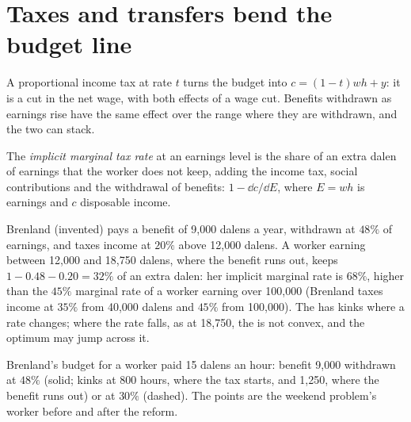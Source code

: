 \section{Taxes and transfers bend the budget line}\label{sec:b1:labour-supply-and-saving:taxes}

A proportional income tax at rate $t$ turns the budget into
$c = (1 - t)w h + y$: it is a cut in the net wage, with both effects of a wage
cut. Benefits withdrawn as earnings rise have the same effect over the
range where they are withdrawn, and the two can stack.

\begin{definition}\label{def:b1:labour-supply-and-saving:implicit-rate}
The \emph{implicit marginal tax rate} at an earnings level is the share of an
extra dalen of earnings that the worker does not keep, adding the income tax,
social contributions and the withdrawal of benefits:
$1 - \dd c/\dd E$, where $E = wh$ is earnings and $c$ disposable income.
\end{definition}

Brenland (invented) pays a benefit of 9,000 dalens a year, withdrawn at
$48\%$ of earnings, and taxes income at $20\%$ above 12,000 dalens. A worker
earning between 12,000 and 18,750 dalens, where the benefit runs out, keeps
$1 - 0.48 - 0.20 = 32\%$ of an extra dalen: her implicit marginal rate is $68\%$,
higher than the $45\%$ marginal rate of a worker earning over 100,000
(Brenland taxes income at $35\%$ from 40,000 dalens and $45\%$ from 100,000). The  has kinks where a rate changes; where the rate falls, as at 18,750, the
 is not convex, and the optimum may jump across it.

\begin{omfigure}

{\small Brenland's budget for a worker paid 15 dalens an hour: benefit 9,000
withdrawn at $48\%$ (solid; kinks at 800 hours, where the tax starts, and
1,250, where the benefit runs out) or at $30\%$ (dashed). The points are the
weekend problem's worker before and after the reform.}
\end{omfigure}

